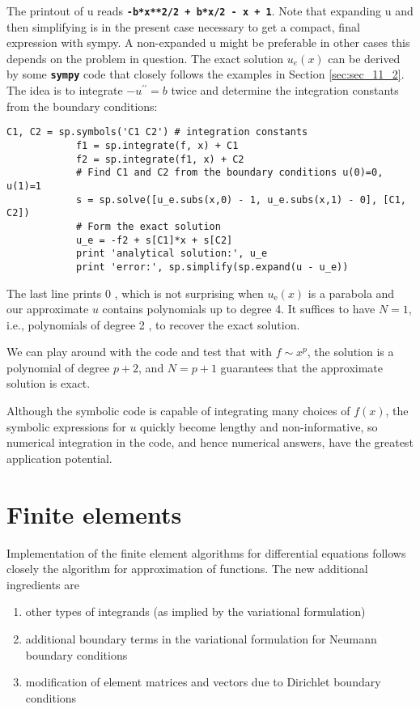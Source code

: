\documentclass[../main.tex]{subfiles}
\begin{document}
	\noindent The printout of $\mathrm{u}$ reads \textbf{\texttt{-b*x**2/2 + b*x/2 - x + 1}}. Note that expanding $\mathrm{u}$ and then simplifying is in the present case necessary to get a compact, final expression with sympy. A non-expanded u might be preferable in other cases this depends on the problem in question.\smallbreak
	The exact solution $u_{e}(x)$ can be derived by some \textbf{\texttt{sympy}} code that closely follows the examples in Section \ref{sec:sec_11_2}. The idea is to integrate $-u^{\prime \prime}=b$ twice and determine the integration constants from the boundary conditions:

		\begin{lstlisting}[numbers=none]
			C1, C2 = sp.symbols('C1 C2') # integration constants
			f1 = sp.integrate(f, x) + C1
			f2 = sp.integrate(f1, x) + C2
			# Find C1 and C2 from the boundary conditions u(0)=0, u(1)=1
			s = sp.solve([u_e.subs(x,0) - 1, u_e.subs(x,1) - 0], [C1, C2])
			# Form the exact solution
			u_e = -f2 + s[C1]*x + s[C2]
			print 'analytical solution:', u_e
			print 'error:', sp.simplify(sp.expand(u - u_e))
		\end{lstlisting}
	
	
	\noindent The last line prints 0 , which is not surprising when $u_{\mathrm{e}}(x)$ is a parabola and our approximate $u$ contains polynomials up to degree 4. It suffices to have $N=1$, i.e., polynomials of degree 2 , to recover the exact solution.
	
	We can play around with the code and test that with $f \sim x^{p}$, the solution is a polynomial of degree $p+2$, and $N=p+1$ guarantees that the approximate solution is exact.
	
	Although the symbolic code is capable of integrating many choices of $f(x)$, the symbolic expressions for $u$ quickly become lengthy and non-informative, so numerical integration in the code, and hence numerical answers, have the greatest application potential.\bigbreak
	
	\section[Finite elements]{Finite elements}
		\label{sec:sec_16_3}
		 \noindent Implementation of the finite element algorithms for differential equations follows closely the algorithm for approximation of functions. The new additional ingredients are
		 \begin{enumerate}
		 	\item other types of integrands (as implied by the variational formulation)
		  	\item additional boundary terms in the variational formulation for Neumann boundary conditions
		 	\item modification of element matrices and vectors due to Dirichlet boundary conditions
		\end{enumerate}
		 
\end{document}

